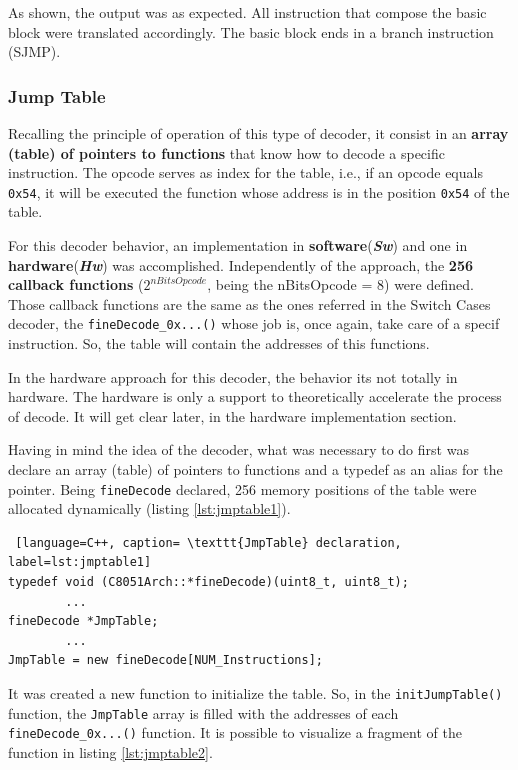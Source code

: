 \documentclass[12pt]{article}
\newcounter{subsubsubsection}[subsubsection]
\begin{document}
{As shown, the output was as expected. All instruction that compose the basic block were translated accordingly. The basic block ends in a branch instruction (SJMP).

\subsubsection{Jump Table}

Recalling the principle of operation of this type of decoder, it consist in an \textbf{array (table) of pointers to functions} that know how to decode a specific instruction. The opcode serves as index for the table, i.e., if an opcode equals \texttt{0x54}, it will be executed the function whose address is in the position \texttt{0x54} of the table. 


For this decoder behavior, an implementation in \textbf{software}(\textbf{\textit{Sw}}) and one in \textbf{hardware}(\textit{\textbf{Hw}}) was accomplished. Independently of the approach, the \textbf{256 callback functions} ($2^{nBitsOpcode}$, being the nBitsOpcode = 8) were defined. Those callback functions are the same as the ones referred in the Switch Cases decoder, the \texttt{fineDecode\_0x...()} whose job is, once again, take care of a specif instruction. So, the table will contain the addresses of this functions. 

In the hardware approach for this decoder, the behavior its not totally in hardware. The hardware is only a support to theoretically accelerate the process of decode. It will get clear later, in the hardware implementation section.


Having in mind the idea of the decoder, what was necessary to do first was declare an array (table) of pointers to functions and a typedef as an alias for the pointer. Being \texttt{fineDecode} declared, 256 memory positions of the table were allocated dynamically (listing \ref{lst:jmptable1}). 

\begin{lstlisting} [language=C++, caption= \texttt{JmpTable} declaration, label=lst:jmptable1]
typedef void (C8051Arch::*fineDecode)(uint8_t, uint8_t);
		...
fineDecode *JmpTable;
		...
JmpTable = new fineDecode[NUM_Instructions];
\end{lstlisting}


It was created a new function to initialize the table. So, in the \texttt{initJumpTable()} function, the \texttt{JmpTable} array is filled with the addresses of each \texttt{fineDecode\_0x...()} function. It is possible to visualize a fragment of the function in listing \ref{lst:jmptable2}.   

}
\end{document}
